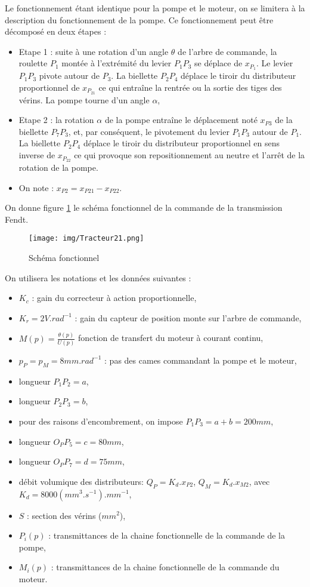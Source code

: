 Le fonctionnement étant identique pour la pompe et le moteur, on se limitera à la description du fonctionnement de la pompe. Ce fonctionnement peut être décomposé en deux étapes :
\begin{itemize}
 \item Etape 1 : suite à une rotation d'un angle $\theta$ de l'arbre de commande, la roulette $P_1$ montée à l'extrémité du levier $P_{1}P_{3}$ se déplace de $x_{P_1}$. Le levier $P_{1}P_{3}$ pivote autour de $P_3$. La biellette $P_{2}P_{4}$ déplace le tiroir du distributeur proportionnel de $x_{P_{21}}$ ce qui entraîne la rentrée ou la sortie des tiges des vérins. La pompe tourne d'un angle $\alpha$,
 \item Etape 2 : la rotation $\alpha$ de la pompe entraîne le déplacement noté $x_{P3}$ de la biellette $P_{7}P_{3}$, et, par conséquent, le pivotement du levier $P_{1}P_{3}$ autour de $P_1$. La biellette $P_{2}P_{4}$
déplace le tiroir du distributeur proportionnel en sens inverse de $x_{P_{22}}$ ce qui provoque son repositionnement au neutre et l'arrêt de la rotation de la pompe.
 \item On note : $x_{P2}=x_{P21}-x_{P22}$.
\end{itemize}

On donne figure \ref{fig21} le schéma fonctionnel de la commande de la transmission Fendt.

\begin{figure}[!h]
\centering\texttt{[image: img/Tracteur21.png]}
\caption{Schéma fonctionnel}
\label{fig21}
\end{figure}

On utilisera les notations et les données suivantes :
\begin{itemize}
  \item $K_c$ : gain du correcteur à action proportionnelle,
  \item $K_r=2V.rad^{-1}$ : gain du capteur de position monte sur l'arbre de commande,
  \item $M(p)=\frac{\theta(p)}{U(p)}$ fonction de transfert du moteur à courant continu,
  \item $p_P=p_M=8mm.rad^{-1}$ : pas des cames commandant la pompe et le moteur,
  \item longueur $P_{1}P_{2} = a$,
  \item longueur $P_{2}P_{3} = b$,
  \item pour des raisons d'encombrement, on impose $P_{1}P_{3}=a+b=200mm$,
  \item longueur $O_{P}P_{5}=c=80mm$,
  \item longueur $O_{P}P_{7}=d=75mm$,
  \item débit volumique des distributeurs: $Q_P=K_d.x_{P2}$, $Q_M=K_d.x_{M2}$, avec $K_d=8000(mm^3.s^{-1}).mm^{-1}$,
  \item $S$ : section des vérins ($mm^2$),
  \item $P_i(p)$ : transmittances de la chaine fonctionnelle de la commande de la pompe,
  \item $M_i(p)$ : transmittances de la chaine fonctionnelle de la commande du moteur.
\end{itemize}

